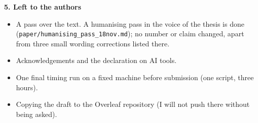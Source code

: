 \documentclass[11pt]{article}
\begin{document}
\textbf{5. Left to the authors}
\begin{itemize}
\item A pass over the text. A humanising pass in the voice of the thesis is done (\texttt{paper/humanising\_pass\_18nov.md}); no number or claim changed, apart from three small wording corrections listed there.
\item Acknowledgements and the declaration on AI tools.
\item One final timing run on a fixed machine before submission (one script, three hours).
\item Copying the draft to the Overleaf repository (I will not push there without being asked).
\end{itemize}
\end{document}
